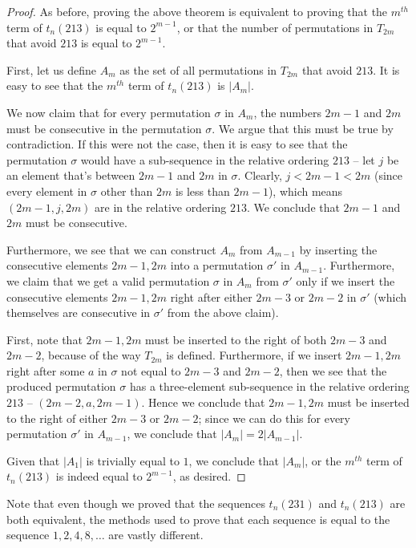 \documentclass[11pt,letterpaper,twoside,english]{article}
\theoremstyle{theorem}
\theoremstyle{remark}
\begin{document}
\begin{proof}
As before, proving the above theorem is equivalent to proving that the $m^{th}$ term of $t_n(213)$ is equal to $2^{m-1}$, or that the number of permutations in $T_{2m}$ that avoid $213$ is equal to $2^{m-1}$.

First, let us define $A_m$ as the set of all permutations in $T_{2m}$ that avoid $213$. It is easy to see that the $m^{th}$ term of $t_n(213)$ is $|A_m|$.

We now claim that for every permutation $\sigma$ in $A_m$, the numbers $2m-1$ and $2m$ must be consecutive in the permutation $\sigma$. We argue that this must be true by contradiction. If this were not the case, then it is easy to see that the permutation $\sigma$ would have a sub-sequence in the relative ordering $213$ -- let $j$ be an element that's between $2m-1$ and $2m$ in $\sigma$. Clearly, $j < 2m -1 < 2m$ (since every element in $\sigma$ other than $2m$ is less than $2m-1$), which means $(2m - 1, j, 2m)$ are in the relative ordering $213$. We conclude that $2m-1$ and $2m$ must be consecutive.

Furthermore, we see that we can construct $A_m$ from $A_{m-1}$ by inserting the consecutive elements $2m-1, 2m$ into a permutation $\sigma'$ in $A_{m-1}$. Furthermore, we claim that we get a valid permutation $\sigma$ in $A_m$ from $\sigma'$ only if we insert the consecutive elements $2m-1, 2m$ right after either $2m-3$ or $2m-2$ in $\sigma'$ (which themselves are consecutive in $\sigma'$ from the above claim).

First, note that $2m-1, 2m$ must be inserted to the right of both $2m-3$ and $2m-2$, because of the way $T_{2m}$ is defined. Furthermore, if we insert $2m-1, 2m$ right after some $a$ in $\sigma$ not equal to $2m-3$ and $2m-2$, then we see that the produced permutation $\sigma$ has a three-element sub-sequence in the relative ordering $213$ -- $(2m-2, a, 2m-1)$. Hence we conclude that $2m-1, 2m$ must be inserted to the right of either $2m-3$ or $2m-2$; since we can do this for every permutation $\sigma'$ in $A_{m-1}$, we conclude that $|A_m| = 2|A_{m-1}|$.

Given that $|A_1|$ is trivially equal to $1$, we conclude that $|A_m|$, or the $m^{th}$ term of $t_n(213)$ is indeed equal to $2^{m-1}$, as desired.
\end{proof}

Note that even though we proved that the sequences $t_n(231)$ and $t_n(213)$ are both equivalent, the methods used to prove that each sequence is equal to the sequence $1, 2, 4, 8, \ldots$ are vastly different.
\end{document}
